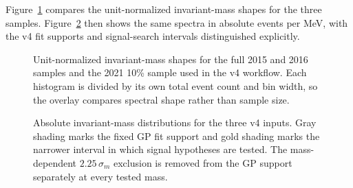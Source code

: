 Figure~\ref{fig:dataset-mass-shape-overlay} compares the unit-normalized invariant-mass
shapes for the three samples. Figure~\ref{fig:dataset-mass-distributions-log} then shows
the same spectra in absolute events per MeV, with the v4 fit supports and signal-search
intervals distinguished explicitly.

\begin{figure}[H]
\centering
{}
\caption{Unit-normalized invariant-mass shapes for the full 2015 and 2016 samples
and the 2021 10\% sample used in the v4 workflow. Each histogram is divided by its
own total event count and bin width, so the overlay compares spectral shape rather
than sample size.}
\label{fig:dataset-mass-shape-overlay}
\end{figure}

\begin{figure}[H]
\centering
{}
\caption{Absolute invariant-mass distributions for the three v4 inputs. Gray
shading marks the fixed GP fit support and gold shading marks the narrower interval
in which signal hypotheses are tested. The mass-dependent
$2.25\,\sigma_m$ exclusion is removed from the GP support separately at every tested
mass.}
\label{fig:dataset-mass-distributions-log}
\end{figure}
